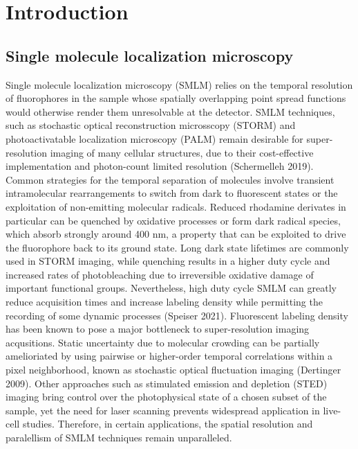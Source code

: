 \documentclass{ucetd}
\begin{document}
\mainmatter



\section{Introduction}

\subsection{Single molecule localization microscopy}

Single molecule localization microscopy (SMLM) relies on the temporal resolution of fluorophores in the sample whose spatially overlapping point spread functions would otherwise render them unresolvable at the detector. SMLM techniques, such as stochastic optical reconstruction microsscopy (STORM) and photoactivatable localization microscopy (PALM) remain desirable for super-resolution imaging of many cellular structures, due to their cost-effective implementation and photon-count limited resolution (Schermelleh 2019). Common strategies for the temporal separation of molecules involve transient intramolecular rearrangements to switch from dark to fluorescent states or the exploitation of non-emitting molecular radicals. Reduced rhodamine derivates in particular can be quenched by oxidative processes or form dark radical species, which absorb strongly around 400 nm, a property that can be exploited to drive the fluorophore back to its ground state. Long dark state lifetimes are commonly used in STORM imaging, while quenching results in a higher duty cycle and increased rates of photobleaching due to irreversible oxidative damage of important functional groups. Nevertheless, high duty cycle SMLM can greatly reduce acquisition times and increase labeling density while permitting the recording of some dynamic processes (Speiser 2021). Fluorescent labeling density has been known to pose a major bottleneck to super-resolution imaging acqusitions. Static uncertainty due to molecular crowding can be partially amelioriated by using pairwise or higher-order temporal correlations within a pixel neighborhood, known as stochastic optical fluctuation imaging (Dertinger 2009). Other approaches such as stimulated emission and depletion (STED) imaging bring control over the photophysical state of a chosen subset of the sample, yet the need for laser scanning prevents widespread application in live-cell studies. Therefore, in certain applications, the spatial resolution and paralellism of SMLM techniques remain unparalleled.
\end{document}
